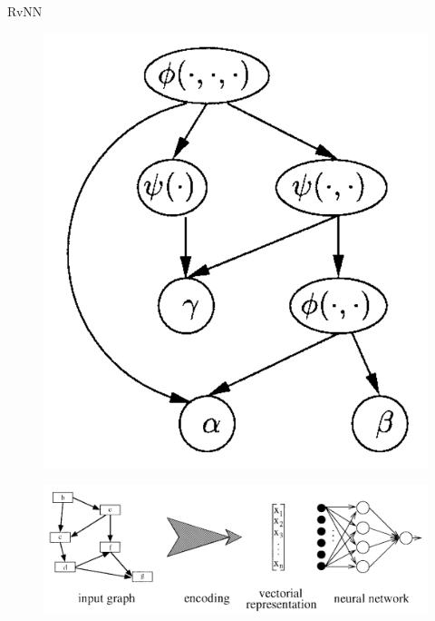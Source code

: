 \documentclass[14pt,aspectratio=169,hyperref={pdftex,unicode},xcolor=dvipsnames]{beamer}
\begin{document}
\begin{frame}[noframenumbering]{RvNN \cite{rvnn-intro-paper} \cite{rvnn-intro-paper-2}}
\begin{center}
\begin{minipage}{0.5\textwidth}
\begin{figure}[ht]
\begin{center}
  \includegraphics[scale=0.15]{./assets/rvnn-term-dag.png}
\end{center}
\end{figure}

\end{minipage}

\begin{figure}[ht]
\begin{center}
  \includegraphics[scale=0.1]{./assets/rvnn-process.png}
\end{center}
\end{figure}

\end{center}

\end{frame}
\end{document}
